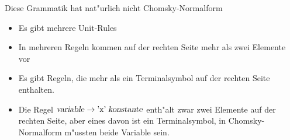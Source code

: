 \begin{loesung}
Diese Grammatik hat nat"urlich nicht Chomsky-Normalform
\begin{itemize}
\item Es gibt mehrere Unit-Rules
\item In mehreren Regeln kommen auf der rechten Seite mehr als
zwei Elemente vor
\item Es gibt Regeln, die mehr als ein Terminalsymbol auf der rechten
Seite enthalten.
\item Die Regel
$\text{\textsl{variable}}\to \text{'{\tt x}'}\;\text{\textsl{konstante}}$
enth"alt zwar zwei Elemente auf der rechten Seite, aber eines davon
ist ein Terminalsymbol, in Chomsky-Normalform m"ussten beide Variable
sein.
\qedhere
\end{itemize}
\end{loesung}
